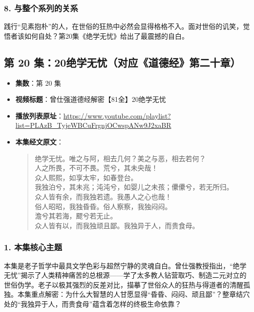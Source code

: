 \subsubsection{8. 与整个系列的关系}
践行“见素抱朴”的人，在世俗的狂热中必然会显得格格不入。面对世俗的讥笑，觉悟者该如何自处？第20集《绝学无忧》给出了最震撼的自白。

\clearpage

\subsection{第 20 集：20绝学无忧（对应《道德经》第二十章）}
\label{sec:ep20}

\begin{itemize}
    \item \textbf{集数}：第 20 集
    \item \textbf{视频标题}：曾仕强道德经解密【81全】20绝学无忧
    \item \textbf{播放列表原址}：\url{https://www.youtube.com/playlist?list=PLAzB_TyjeWBCuFrgnjOCwspANw9J2xaBR}
    \item \textbf{本集经文原文}：
    \begin{quote}\kaishu
    绝学无忧。唯之与阿，相去几何？美之与恶，相去若何？\\
    人之所畏，不可不畏。荒兮，其未央哉！\\
    众人熙熙，如享太牢，如春登台。\\
    我独泊兮，其未兆；沌沌兮，如婴儿之未孩；儽儽兮，若无所归。\\
    众人皆有余，而我独若遗。我愚人之心也哉！\\
    俗人昭昭，我独昏昏。俗人察察，我独闷闷。\\
    澹兮其若海，飂兮若无止。\\
    众人皆有以，而我独顽且鄙。我独异于人，而贵食母。
    \end{quote}
\end{itemize}

\subsubsection{1. 本集核心主题}
本集是老子哲学中最具文学色彩与超然宁静的灵魂自白。曾仕强教授指出，“绝学无忧”揭示了人类精神痛苦的总根源——学了太多教人钻营取巧、制造二元对立的世俗伪学。老子以极其强烈的反差对比，描摹了世俗众人的狂热与得道者的清醒孤独。本集重点解密：为什么大智慧的人甘愿显得“昏昏、闷闷、顽且鄙”？整章结穴处的“我独异于人，而贵食母”蕴含着怎样的终极生命依靠？

